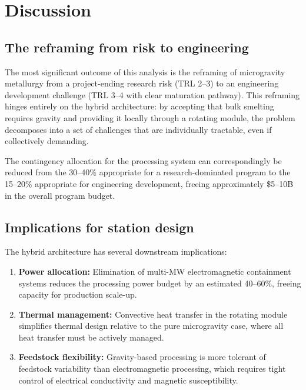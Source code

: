 \documentclass[preprint,12pt]{elsarticle}
\begin{document}
\section{Discussion}
\label{sec:discussion}

\subsection{The reframing from risk to engineering}

The most significant outcome of this analysis is the reframing of microgravity metallurgy from a project-ending research risk (TRL 2--3) to an engineering development challenge (TRL 3--4 with clear maturation pathway). This reframing hinges entirely on the hybrid architecture: by accepting that bulk smelting requires gravity and providing it locally through a rotating module, the problem decomposes into a set of challenges that are individually tractable, even if collectively demanding.

The contingency allocation for the processing system can correspondingly be reduced from the 30--40\% appropriate for a research-dominated program to the 15--20\% appropriate for engineering development, freeing approximately \$5--10B in the overall program budget.

\subsection{Implications for station design}

The hybrid architecture has several downstream implications:

\begin{enumerate}
    \item \textbf{Power allocation:} Elimination of multi-MW electromagnetic containment systems reduces the processing power budget by an estimated 40--60\%, freeing capacity for production scale-up.
    \item \textbf{Thermal management:} Convective heat transfer in the rotating module simplifies thermal design relative to the pure microgravity case, where all heat transfer must be actively managed.
    \item \textbf{Feedstock flexibility:} Gravity-based processing is more tolerant of feedstock variability than electromagnetic processing, which requires tight control of electrical conductivity and magnetic susceptibility.
\end{enumerate}
\end{document}
